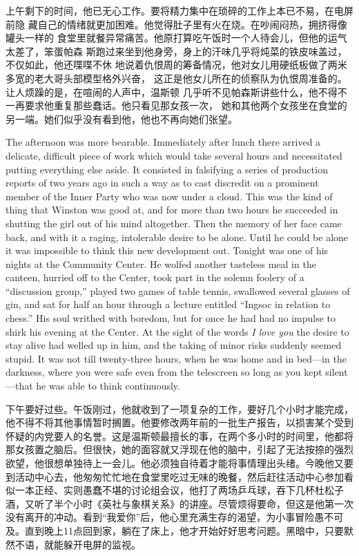 \begin{paracol}{2}
上午剩下的时间，他已无心工作。要将精力集中在琐碎的工作上本已不易，在电屏前隐
藏自己的情绪就更加困难。他觉得肚子里有火在烧。在吵闹闷热，拥挤得像罐头一样的
食堂里就餐异常痛苦。他原打算吃午饭时一个人待会儿，但他的运气太差了，笨蛋帕森
斯跑过来坐到他身旁，身上的汗味几乎将炖菜的铁皮味盖过，不仅如此，他还喋喋不休
地说着仇恨周的筹备情况，他对女儿用硬纸板做了两米多宽的老大哥头部模型格外兴奋，
这正是他女儿所在的侦察队为仇恨周准备的。让人烦躁的是，在喧闹的人声中，温斯顿
几乎听不见帕森斯讲些什么，他不得不一再要求他重复那些蠢话。他只看见那女孩一次，
她和其他两个女孩坐在食堂的另一端。她们似乎没有看到他，他也不再向她们张望。

\switchcolumn*

The afternoon was more bearable. Immediately after lunch there arrived a
delicate, difficult piece of work which would take several hours and
necessitated putting everything else aside. It consisted in falsifying a
series of production reports of two years ago in such a way as to cast
discredit on a prominent member of the Inner Party who was now under a
cloud. This was the kind of thing that Winston was good at, and for more
than two hours he succeeded in shutting the girl out of his mind
altogether. Then the memory of her face came back, and with it a raging,
intolerable desire to be alone. Until he could be alone it was
impossible to think this new development out. Tonight was one of his
nights at the Community Center. He wolfed another tasteless meal in the
canteen, hurried off to the Center, took part in the solemn foolery of a
``discussion group,'' played two games of table tennis, swallowed several
glasses of gin, and sat for half an hour through a lecture entitled
``Ingsoc in relation to chess.'' His soul writhed with boredom, but for
once he had had no impulse to shirk his evening at the Center. At the
sight of the words \emph{I love you} the desire to stay alive had welled
up in him, and the taking of minor risks suddenly seemed stupid. It was
not till twenty-three hours, when he was home and in bed---in the
darkness, where you were safe even from the telescreen so long as you
kept silent---that he was able to think continuously.

\switchcolumn

下午要好过些。午饭刚过，他就收到了一项复杂的工作，要好几个小时才能完成，他不得不将其他事情暂时搁置。他要修改两年前的一批生产报告，以损害某个受到怀疑的内党要人的名誉。这是温斯顿最擅长的事，在两个多小时的时间里，他都将那女孩置之脑后。但很快，她的面容就又浮现在他的脑中，引起了无法按捺的强烈欲望，他很想单独待上一会儿。他必须独自待着才能将事情理出头绪。今晚他又要到活动中心去，他匆匆忙忙地在食堂里吃过无味的晚餐，然后赶往活动中心参加看似一本正经、实则愚蠢不堪的讨论组会议，他打了两场乒乓球，吞下几杯杜松子酒，又听了半个小时《英社与象棋关系》的讲座。尽管烦得要命，但这是他第一次没有离开的冲动。看到``我爱你''后，他心里充满生存的渴望，为小事冒险愚不可及。直到晚上11点回到家，躺在了床上，他才开始好好思考问题。黑暗中，只要默然不语，就能躲开电屏的监视。


\end{paracol}
